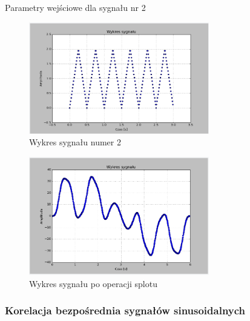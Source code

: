 \documentclass{article}
\begin{document}
{{\begin{table}[h!]
                \caption{Parametry wejściowe dla sygnału nr 2}
            \end{table}
            \begin{figure}[h!]
                \centering
                \includegraphics[width=0.7\textwidth]{img/splot6.png}
                \caption{Wykres sygnału numer 2}
            \end{figure}

            \begin{figure}[h!]
                \centering
                \includegraphics[width=0.7\textwidth]{img/splot7.png}
                \caption{Wykres sygnału po operacji splotu}
            \end{figure}
            \FloatBarrier
        }
        \subsubsection{Korelacja bezpośrednia sygnałów sinusoidalnych} \label{eksperyment:korelacja1}{

}}
\end{document}
